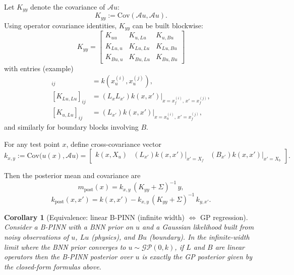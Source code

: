 \documentclass[11pt]{article}
\newtheorem{corollary}{Corollary}
\begin{document}
Let $K_{yy}$ denote the covariance of $\mathcal A u$:
\begin{equation}
K_{yy} := \mathrm{Cov}(\mathcal A u,\mathcal A u).
\end{equation}
Using operator covariance identities, $K_{yy}$ can be built blockwise:
\begin{equation}
K_{yy}=
\begin{bmatrix}
K_{uu} & K_{u,Lu} & K_{u,Bu}\\
K_{Lu,u} & K_{Lu,Lu} & K_{Lu,Bu}\\
K_{Bu,u} & K_{Bu,Lu} & K_{Bu,Bu}
\end{bmatrix}
\end{equation}
with entries (example)
\begin{align}
[K_{uu}]_{ij} &= k(x_u^{(i)},x_u^{(j)}),\\
[K_{Lu,Lu}]_{ij} &= (L_x L_{x'})k(x,x')\big|_{x=x_f^{(i)},\,x'=x_f^{(j)}},\\
[K_{u,Lu}]_{ij} &= (L_{x'})k(x,x')\big|_{x=x_u^{(i)},\,x'=x_f^{(j)}},
\end{align}
and similarly for boundary blocks involving $B$.

For any test point $x$, define cross-covariance vector
\begin{equation}
k_{x,y}:=\mathrm{Cov}\big(u(x),\mathcal A u\big)
=
\begin{bmatrix}
k(x,X_u) & (L_{x'})k(x,x')|_{x'=X_f} & (B_{x'})k(x,x')|_{x'=X_b}
\end{bmatrix}.
\end{equation}

Then the posterior mean and covariance are
\begin{equation}
m_{\text{post}}(x) = k_{x,y}\,(K_{yy}+\Sigma)^{-1}\,y,
\end{equation}
\begin{equation}
k_{\text{post}}(x,x') = k(x,x') - k_{x,y}\,(K_{yy}+\Sigma)^{-1}\,k_{y,x'}.
\end{equation}

\begin{corollary}[Equivalence: linear B-PINN (infinite width) $\Leftrightarrow$ GP regression]
Consider a B-PINN with a BNN prior on $u$ and a Gaussian likelihood built from noisy observations
of $u$, $Lu$ (physics), and $Bu$ (boundary). In the infinite-width limit where the BNN prior converges to
$u\sim \mathcal{GP}(0,k)$, if $L$ and $B$ are linear operators then the B-PINN posterior over $u$ is exactly
the GP posterior given by the closed-form formulas above.
\end{corollary}
\end{document}
